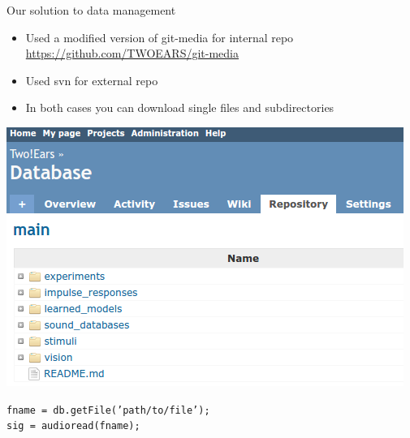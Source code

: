 \documentclass{beamer}
\begin{document}
\begin{frame}[fragile]{Our solution to data management}

    \begin{itemize}
        \item Used a modified version of git-media for internal repo \\
            {\small\url{https://github.com/TWOEARS/git-media}}
        \item Used svn for external repo
        \item In both cases you can download single files and subdirectories
    \end{itemize}

    \vspace{0.5cm}

    \begin{minipage}[b]{.4\columnwidth}
        \includegraphics[width=.9\textwidth]{fig/redmine}
    \end{minipage}
    \hfill
    \begin{minipage}[b]{.59\columnwidth}
        \small
        \texttt{fname = db.getFile('path/to/file');} \\
        \texttt{sig = audioread(fname);}

        \vspace{1cm}

    \end{minipage}

\end{frame}
\end{document}
